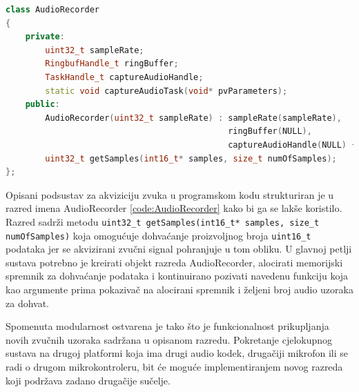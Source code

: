 \begin{lstlisting}[language=C++, caption=Razred AudioRecorder, label=code:AudioRecorder]
class AudioRecorder
{
    private:
        uint32_t sampleRate;
        RingbufHandle_t ringBuffer;
        TaskHandle_t captureAudioHandle;
        static void captureAudioTask(void* pvParameters);
    public:
        AudioRecorder(uint32_t sampleRate) : sampleRate(sampleRate), 
                                             ringBuffer(NULL), 
                                             captureAudioHandle(NULL) {}
        uint32_t getSamples(int16_t* samples, size_t numOfSamples);
};
\end{lstlisting}

Opisani podsustav za akviziciju zvuka u programskom kodu strukturiran je u razred imena 
AudioRecorder \ref{code:AudioRecorder} kako bi ga se lakše koristilo. Razred sadrži metodu
\texttt{uint32\_t getSamples(int16\_t* samples, size\_t numOfSamples)} koja 
omogućuje dohvaćanje proizvoljnog broja \texttt{uint16\_t} podataka jer 
se akvizirani zvučni signal pohranjuje u tom obliku. U glavnoj petlji sustava potrebno je kreirati objekt
razreda AudioRecorder, alocirati memorijski spremnik za dohvaćanje podataka i kontinuirano
pozivati navedenu funkciju koja kao argumente prima pokazivač na alocirani spremnik
i željeni broj audio uzoraka za dohvat.

Spomenuta modularnost ostvarena je tako što je funkcionalnost prikupljanja
novih zvučnih uzoraka sadržana u opisanom razredu. Pokretanje cjelokupnog sustava
na drugoj platformi koja ima drugi audio kodek, drugačiji mikrofon ili se 
radi o drugom mikrokontroleru, bit će moguće implementiranjem novog razreda koji
podržava zadano drugačije sučelje.